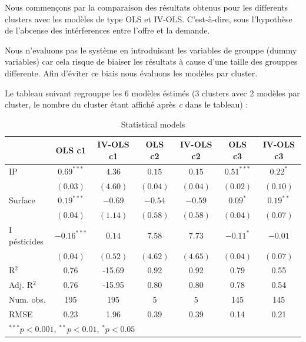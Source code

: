 \documentclass[11pt,]{article}
\begin{document}
Nous commençons par la comparaison des résultats obtenus pour les
differents clusters avec les modèles de type OLS et IV-OLS.
C'est-à-dire, sous l'hypothèse de l'abcense des intérferences entre
l'offre et la demande.

Nous n'evaluons pas le système en introduisant les variables de grouppe
(dummy variables) car cela risque de biaiser les résultats à cause d'une
taille des grouppes differente. Afin d'éviter ce biais nous évaluons les
modèles par cluster.

Le tableau suivant regrouppe les 6 modèles éstimés (3 clusters avec 2
modèles par cluster, le nombre du cluster étant affiché après \emph{c}
dans le tableau) :

\FloatBarrier

\begin{table}[!htbp]
\begin{center}
\begin{tabular}{l c c c c c c }
\hline
 & OLS c1 & IV-OLS c1 & OLS c2 & IV-OLS c2 & OLS c3 & IV-OLS c3 \\
\hline
IP           & $0.69^{***}$  & $4.36$   & $0.15$   & $0.15$   & $0.51^{***}$ & $0.22^{*}$  \\
             & $(0.03)$      & $(4.60)$ & $(0.04)$ & $(0.04)$ & $(0.02)$     & $(0.10)$    \\
Surface      & $0.19^{***}$  & $-0.69$  & $-0.54$  & $-0.59$  & $0.09^{*}$   & $0.19^{**}$ \\
             & $(0.04)$      & $(1.14)$ & $(0.58)$ & $(0.58)$ & $(0.04)$     & $(0.07)$    \\
I pésticides & $-0.16^{***}$ & $0.14$   & $7.58$   & $7.73$   & $-0.11^{*}$  & $-0.01$     \\
             & $(0.04)$      & $(0.52)$ & $(4.62)$ & $(4.65)$ & $(0.04)$     & $(0.07)$    \\
\hline
R$^2$        & 0.76          & -15.69   & 0.92     & 0.92     & 0.79         & 0.55        \\
Adj. R$^2$   & 0.76          & -15.95   & 0.80     & 0.80     & 0.78         & 0.54        \\
Num. obs.    & 195           & 195      & 5        & 5        & 145          & 145         \\
RMSE         & 0.23          & 1.96     & 0.39     & 0.39     & 0.14         & 0.21        \\
\hline
\multicolumn{7}{l}{\scriptsize{$^{***}p<0.001$, $^{**}p<0.01$, $^*p<0.05$}}
\end{tabular}
\caption{Statistical models}
\label{table : ols et ivols clusters}
\end{center}
\end{table}
\end{document}
